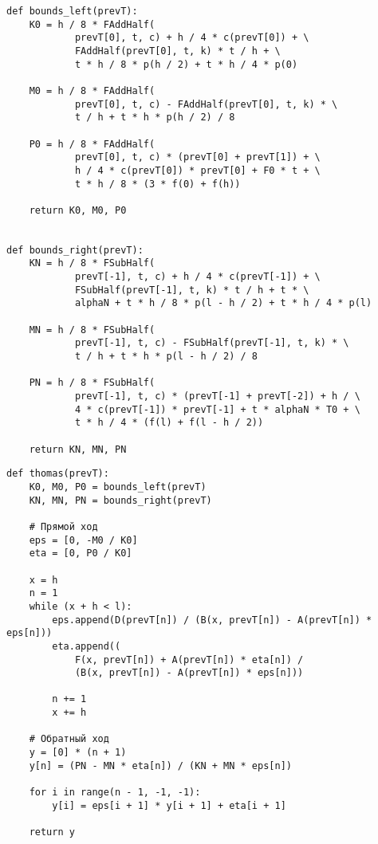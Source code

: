 \begin{lstlisting}[caption={Краевые условия}]
def bounds_left(prevT):
    K0 = h / 8 * FAddHalf(
            prevT[0], t, c) + h / 4 * c(prevT[0]) + \
            FAddHalf(prevT[0], t, k) * t / h + \
            t * h / 8 * p(h / 2) + t * h / 4 * p(0)

    M0 = h / 8 * FAddHalf(
            prevT[0], t, c) - FAddHalf(prevT[0], t, k) * \
            t / h + t * h * p(h / 2) / 8

    P0 = h / 8 * FAddHalf(
            prevT[0], t, c) * (prevT[0] + prevT[1]) + \
            h / 4 * c(prevT[0]) * prevT[0] + F0 * t + \
            t * h / 8 * (3 * f(0) + f(h))

    return K0, M0, P0


def bounds_right(prevT):
    KN = h / 8 * FSubHalf(
            prevT[-1], t, c) + h / 4 * c(prevT[-1]) + \
            FSubHalf(prevT[-1], t, k) * t / h + t * \
            alphaN + t * h / 8 * p(l - h / 2) + t * h / 4 * p(l)

    MN = h / 8 * FSubHalf(
            prevT[-1], t, c) - FSubHalf(prevT[-1], t, k) * \
            t / h + t * h * p(l - h / 2) / 8

    PN = h / 8 * FSubHalf(
            prevT[-1], t, c) * (prevT[-1] + prevT[-2]) + h / \
            4 * c(prevT[-1]) * prevT[-1] + t * alphaN * T0 + \
            t * h / 4 * (f(l) + f(l - h / 2))

    return KN, MN, PN
\end{lstlisting}

\begin{lstlisting}[caption={Метод прогонки}]
def thomas(prevT):
    K0, M0, P0 = bounds_left(prevT)
    KN, MN, PN = bounds_right(prevT)

    # Прямой ход
    eps = [0, -M0 / K0]
    eta = [0, P0 / K0]

    x = h
    n = 1
    while (x + h < l):
        eps.append(D(prevT[n]) / (B(x, prevT[n]) - A(prevT[n]) * eps[n]))
        eta.append((
            F(x, prevT[n]) + A(prevT[n]) * eta[n]) /
            (B(x, prevT[n]) - A(prevT[n]) * eps[n]))

        n += 1
        x += h

    # Обратный ход
    y = [0] * (n + 1)
    y[n] = (PN - MN * eta[n]) / (KN + MN * eps[n])

    for i in range(n - 1, -1, -1):
        y[i] = eps[i + 1] * y[i + 1] + eta[i + 1]

    return y
\end{lstlisting}

